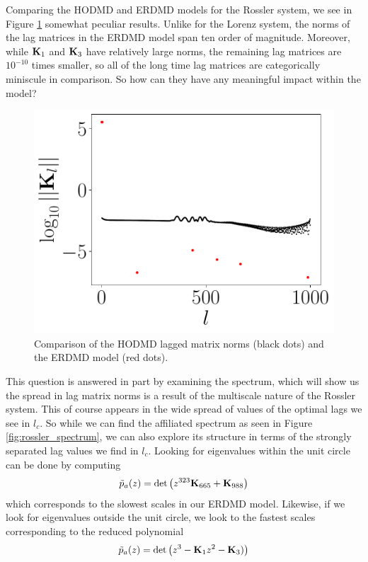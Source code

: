 \documentclass[a4paper,11pt]{article}
\begin{document}
Comparing the HODMD and ERDMD models for the Rossler system, we see in Figure \ref{fig:model_comp_d_988} somewhat peculiar results.  Unlike for the Lorenz system, the norms of the lag matrices in the ERDMD model span ten order of magnitude.  Moreover, while ${\bf K}_{1}$ and ${\bf K}_{3}$ have relatively large norms, the remaining lag matrices are $10^{-10}$ times smaller, so all of the long time lag matrices are categorically miniscule in comparison.  So how can they have any meaningful impact within the model?  
\begin{figure}[!h]
\centering
\includegraphics[width=.7\textwidth]{Rossler_norm_full_model_988}
\caption{Comparison of the HODMD lagged matrix norms (black dots) and the ERDMD model (red dots).}
\label{fig:model_comp_d_988}
\end{figure}

This question is answered in part by examining the spectrum, which will show us the spread in lag matrix norms is a result of the multiscale nature of the Rossler system.  This of course appears in the wide spread of values of the optimal lags we see in $l_{c}$.  So while we can find the affiliated spectrum as seen in Figure \ref{fig:rossler_spectrum}, we can also explore its structure in terms of the strongly separated lag values we find in $l_{c}$.  Looking for eigenvalues within the unit circle can be done by computing
\[
\tilde{p}_{a}(z) = \text{det}\left(z^{323}{\bf K}_{665} + {\bf K}_{988} \right)
\]
which corresponds to the slowest scales in our ERDMD model.  Likewise, if we look for eigenvalues outside the unit circle, we look to the fastest scales corresponding to the reduced polynomial
\[
\tilde{p}_{a}(z) = \text{det}\left(z^{3} - {\bf K}_{1}z^{2} - {\bf K}_{3}) \right)
\]
\end{document}
